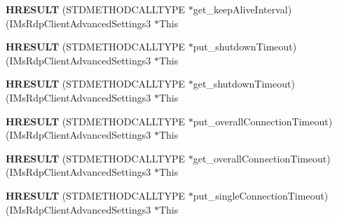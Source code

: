 \begin{DoxyCompactItemize}
\item 
\mbox{\label{struct_i_ms_rdp_client_advanced_settings3_vtbl_a9f9b281c78d9715eb9be082c8ead9152}} 
{\bfseries H\+R\+E\+S\+U\+LT} (S\+T\+D\+M\+E\+T\+H\+O\+D\+C\+A\+L\+L\+T\+Y\+PE $\ast$get\+\_\+keep\+Alive\+Interval)(I\+Ms\+Rdp\+Client\+Advanced\+Settings3 $\ast$This
\item 
\mbox{\label{struct_i_ms_rdp_client_advanced_settings3_vtbl_a08d1384356cc7e296c0045b839e8252c}} 
{\bfseries H\+R\+E\+S\+U\+LT} (S\+T\+D\+M\+E\+T\+H\+O\+D\+C\+A\+L\+L\+T\+Y\+PE $\ast$put\+\_\+shutdown\+Timeout)(I\+Ms\+Rdp\+Client\+Advanced\+Settings3 $\ast$This
\item 
\mbox{\label{struct_i_ms_rdp_client_advanced_settings3_vtbl_a42769f591aef9e8646a229ab1751a8fe}} 
{\bfseries H\+R\+E\+S\+U\+LT} (S\+T\+D\+M\+E\+T\+H\+O\+D\+C\+A\+L\+L\+T\+Y\+PE $\ast$get\+\_\+shutdown\+Timeout)(I\+Ms\+Rdp\+Client\+Advanced\+Settings3 $\ast$This
\item 
\mbox{\label{struct_i_ms_rdp_client_advanced_settings3_vtbl_a79552cf886f93fee674b92bf83992f29}} 
{\bfseries H\+R\+E\+S\+U\+LT} (S\+T\+D\+M\+E\+T\+H\+O\+D\+C\+A\+L\+L\+T\+Y\+PE $\ast$put\+\_\+overall\+Connection\+Timeout)(I\+Ms\+Rdp\+Client\+Advanced\+Settings3 $\ast$This
\item 
\mbox{\label{struct_i_ms_rdp_client_advanced_settings3_vtbl_a89bd6a02e06efbb7b53d5ec6ba4a3e69}} 
{\bfseries H\+R\+E\+S\+U\+LT} (S\+T\+D\+M\+E\+T\+H\+O\+D\+C\+A\+L\+L\+T\+Y\+PE $\ast$get\+\_\+overall\+Connection\+Timeout)(I\+Ms\+Rdp\+Client\+Advanced\+Settings3 $\ast$This
\item 
\mbox{\label{struct_i_ms_rdp_client_advanced_settings3_vtbl_a3021cf8f8403ee2400f67825b5ea33ff}} 
{\bfseries H\+R\+E\+S\+U\+LT} (S\+T\+D\+M\+E\+T\+H\+O\+D\+C\+A\+L\+L\+T\+Y\+PE $\ast$put\+\_\+single\+Connection\+Timeout)(I\+Ms\+Rdp\+Client\+Advanced\+Settings3 $\ast$This
\item 
\mbox{\label{struct_i_ms_rdp_client_advanced_settings3_vtbl_a12fe40c8840bbed461044f33c0ff62a3}} 

\end{DoxyCompactItemize}
